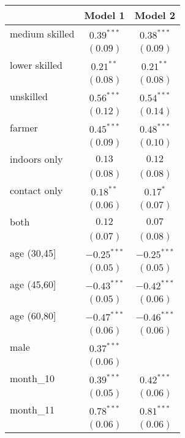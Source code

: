 
\begin{table}[h!]
\begin{center}
\begin{small}
\begin{tabular}{l c c}
\hline
 & Model 1 & Model 2 \\
\hline
medium skilled & $0.39^{***}$  & $0.38^{***}$  \\
               & $(0.09)$      & $(0.09)$      \\
lower skilled  & $0.21^{**}$   & $0.21^{**}$   \\
               & $(0.08)$      & $(0.08)$      \\
unskilled      & $0.56^{***}$  & $0.54^{***}$  \\
               & $(0.12)$      & $(0.14)$      \\
farmer         & $0.45^{***}$  & $0.48^{***}$  \\
               & $(0.09)$      & $(0.10)$      \\
indoors only   & $0.13$        & $0.12$        \\
               & $(0.08)$      & $(0.08)$      \\
contact only   & $0.18^{**}$   & $0.17^{*}$    \\
               & $(0.06)$      & $(0.07)$      \\
both           & $0.12$        & $0.07$        \\
               & $(0.07)$      & $(0.08)$      \\
age (30,45]    & $-0.25^{***}$ & $-0.25^{***}$ \\
               & $(0.05)$      & $(0.05)$      \\
age (45,60]    & $-0.43^{***}$ & $-0.42^{***}$ \\
               & $(0.05)$      & $(0.06)$      \\
age (60,80]    & $-0.47^{***}$ & $-0.46^{***}$ \\
               & $(0.06)$      & $(0.06)$      \\
male           & $0.37^{***}$  &               \\
               & $(0.06)$      &               \\
month\_10      & $0.39^{***}$  & $0.42^{***}$  \\
               & $(0.05)$      & $(0.06)$      \\
month\_11      & $0.78^{***}$  & $0.81^{***}$  \\
               & $(0.06)$      & $(0.06)$      \\

\end{tabular}
\end{small}
\end{center}
\end{table}
